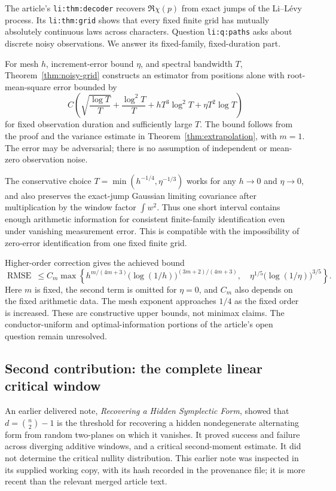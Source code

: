 The article's \texttt{li:thm:decoder} recovers $\Re\chi(p)$ from exact jumps of the Li--L\'evy process. Its \texttt{li:thm:grid} shows that every fixed finite grid has mutually absolutely continuous laws across characters. Question \texttt{li:q:paths} asks about discrete noisy observations. We answer its fixed-family, fixed-duration part.

For mesh $h$, increment-error bound $\eta$, and spectral bandwidth $T$, Theorem~\ref{thm:noisy-grid} constructs an estimator from positions alone with root-mean-square error bounded by
\begin{equation}\label{overview:basic}
C\left(\sqrt{\frac{\log T}{T}}
 +\frac{\log^2T}{T}+hT^3\log^2T+\eta T^2\log T\right)
\end{equation}
for fixed observation duration and sufficiently large $T$. The bound follows from the proof and the variance estimate in Theorem~\ref{thm:extrapolation}, with $m=1$. The error may be adversarial; there is no assumption of independent or mean-zero observation noise.

The conservative choice $T=\min(h^{-1/4},\eta^{-1/3})$ works for any $h\to0$ and $\eta\to0$, and also preserves the exact-jump Gaussian limiting covariance after multiplication by the window factor $\int w^2$. Thus one short interval contains enough arithmetic information for consistent finite-family identification even under vanishing measurement error. This is compatible with the impossibility of zero-error identification from one fixed finite grid.

Higher-order correction gives the achieved bound
\begin{equation}\label{overview:rates}
\operatorname{RMSE}\ \le C_m\max\left\{
h^{m/(4m+3)}\bigl(\log(1/h)\bigr)^{(3m+2)/(4m+3)},\quad
\eta^{1/5}\bigl(\log(1/\eta)\bigr)^{3/5}\right\}.
\end{equation}
Here $m$ is fixed, the second term is omitted for $\eta=0$, and $C_m$ also depends on the fixed arithmetic data. The mesh exponent approaches $1/4$ as the fixed order is increased. These are constructive upper bounds, not minimax claims. The conductor-uniform and optimal-information portions of the article's open question remain unresolved.

\subsection{Second contribution: the complete linear critical window}

An earlier delivered note, \emph{Recovering a Hidden Symplectic Form}, showed that $d=\binom n2-1$ is the threshold for recovering a hidden nondegenerate alternating form from random two-planes on which it vanishes. It proved success and failure across diverging additive windows, and a critical second-moment estimate. It did not determine the critical nullity distribution. This earlier note was inspected in its supplied working copy, with its hash recorded in the provenance file; it is more recent than the relevant merged article text.

